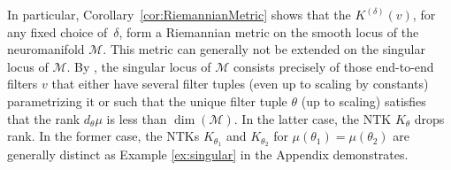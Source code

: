\documentclass[twoside]{article}
\theoremstyle{definition}
\newtheorem{example}[theorem]{Example}
\theoremstyle{remark}
\begin{document}
In particular, Corollary~\ref{cor:RiemannianMetric} shows that the $K^{(\delta)}(v)$, for any fixed choice of~$\delta$, form a Riemannian metric on the smooth locus of the neuromanifold $\mathcal{M}$. 
This metric can generally not be extended on the singular locus of $\mathcal{M}$.
By \cite{kohn2024function}, the singular locus of $\mathcal{M}$ consists precisely of those end-to-end filters $v$ that either have several filter tuples (even up to scaling by constants) parametrizing it or such that the unique filter tuple $\theta$ (up to scaling) satisfies that the rank $d_\theta \mu$ is less than $\dim(\mathcal{M})$. 
In the latter case, the NTK $K_\theta$ drops rank.
In the former case, the NTKs $K_{\theta_1}$ and $K_{\theta_2}$ for $\mu(\theta_1)=\mu(\theta_2)$ are generally distinct as Example \ref{ex:singular} in the Appendix demonstrates.

    
    
\end{document}
